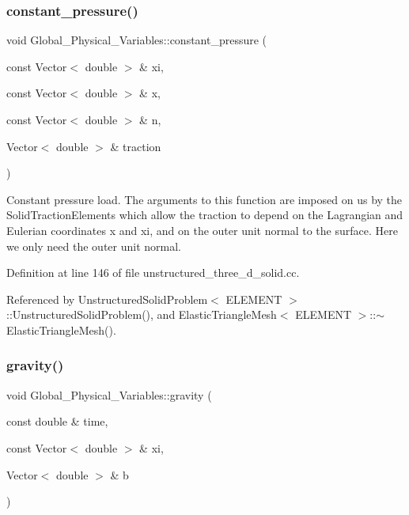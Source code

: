\subsubsection{\texorpdfstring{constant\+\_\+pressure()}{constant\_pressure()}}
{\footnotesize\ttfamily void Global\+\_\+\+Physical\+\_\+\+Variables\+::constant\+\_\+pressure (\begin{DoxyParamCaption}\item[{const Vector$<$ double $>$ \&}]{xi,  }\item[{const Vector$<$ double $>$ \&}]{x,  }\item[{const Vector$<$ double $>$ \&}]{n,  }\item[{Vector$<$ double $>$ \&}]{traction }\end{DoxyParamCaption})}



Constant pressure load. The arguments to this function are imposed on us by the Solid\+Traction\+Elements which allow the traction to depend on the Lagrangian and Eulerian coordinates x and xi, and on the outer unit normal to the surface. Here we only need the outer unit normal. 



Definition at line 146 of file unstructured\+\_\+three\+\_\+d\+\_\+solid.\+cc.



Referenced by Unstructured\+Solid\+Problem$<$ E\+L\+E\+M\+E\+N\+T $>$\+::\+Unstructured\+Solid\+Problem(), and Elastic\+Triangle\+Mesh$<$ E\+L\+E\+M\+E\+N\+T $>$\+::$\sim$\+Elastic\+Triangle\+Mesh().

\mbox{\label{namespaceGlobal__Physical__Variables_a0777aef63372db7f91ad894c38159681}} 
\subsubsection{\texorpdfstring{gravity()}{gravity()}}
{\footnotesize\ttfamily void Global\+\_\+\+Physical\+\_\+\+Variables\+::gravity (\begin{DoxyParamCaption}\item[{const double \&}]{time,  }\item[{const Vector$<$ double $>$ \&}]{xi,  }\item[{Vector$<$ double $>$ \&}]{b }\end{DoxyParamCaption})}



